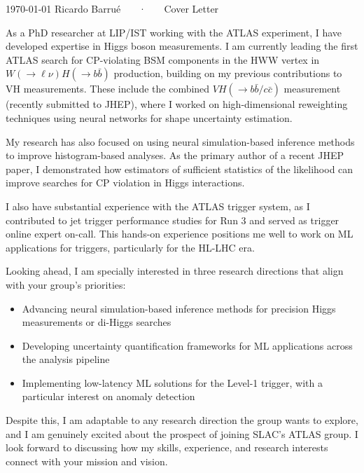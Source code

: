 \documentclass[11pt, a4paper]{awesome-cv}
\begin{document}
\makecvheader[R]

\makecvfooter
  {\today}
  {Ricardo Barrué ~~~·~~~ Cover Letter}
  {}

\makelettertitle

\begin{cvletter}

  As a PhD researcher at LIP/IST working with the ATLAS experiment, I have developed expertise in Higgs boson measurements. I am currently leading the first ATLAS search for CP-violating BSM components in the HWW vertex in $W(\to \ell \nu)H(\to b\bar{b})$ production, building on my previous contributions to VH measurements. These include the combined $VH(\to b\bar{b}/c\bar{c})$ measurement (recently submitted to JHEP), where I worked on high-dimensional reweighting techniques using neural networks for shape uncertainty estimation.

  My research has also focused on using neural simulation-based inference methods to improve histogram-based analyses. As the primary author of a recent JHEP paper, I demonstrated how estimators of sufficient statistics of the likelihood can improve searches for CP violation in Higgs interactions.
  
  I also have substantial experience with the ATLAS trigger system, as I contributed to jet trigger performance studies for Run 3 and served as trigger online expert on-call. This hands-on experience positions me well to work on ML applications for triggers, particularly for the HL-LHC era.
  
  Looking ahead, I am specially interested in three research directions that align with your group's priorities:
  \begin{itemize}
    \item Advancing neural simulation-based inference methods for precision Higgs measurements or di-Higgs searches
    \item Developing uncertainty quantification frameworks for ML applications across the analysis pipeline
    \item Implementing low-latency ML solutions for the Level-1 trigger, with a particular interest on anomaly detection
  \end{itemize}
  
  Despite this, I am adaptable to any research direction the group wants to explore, and I am genuinely excited about the prospect of joining SLAC's ATLAS group. I look forward to discussing how my skills, experience, and research interests connect with your mission and vision.

\end{cvletter}


\makeletterclosing
\end{document}
